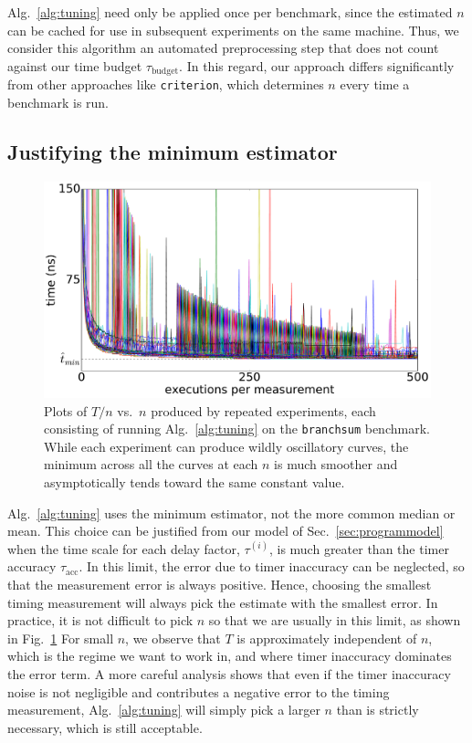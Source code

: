 \documentclass[conference]{IEEEtran}
\begin{document}
Alg.~\ref{alg:tuning} need only be applied once per benchmark, since the
estimated $n$ can be cached for use in subsequent experiments on the same
machine. Thus, we consider this algorithm an automated preprocessing step that
does not count against our time budget $\tau_{\textrm{budget}}$. In this
regard, our approach differs significantly from other approaches like
\lstinline|criterion|, which
determines $n$ every time a benchmark is run.



\subsection{Justifying the minimum estimator}
\label{sec:minimum}

\begin{figure}
\centering
\includegraphics[width=\columnwidth]{figures/fig2/linear_scan_branchsum}
\caption{Plots of $T/n$ vs.\ $n$ produced by repeated experiments, each
consisting of running Alg.~\ref{alg:tuning} on the \lstinline|branchsum|
benchmark. While each experiment can produce wildly oscillatory curves, the
minimum across all the curves at each $n$ is much smoother and asymptotically
tends toward the same constant value.}
\label{fig:scaling}
\end{figure}

Alg.~\ref{alg:tuning} uses the minimum estimator, not the more common median or
mean. This choice can be justified from our model of
Sec.~\ref{sec:programmodel} when the time scale for each delay factor,
$\tau^{(i)}$, is much greater than the timer accuracy $\tau_\textrm{acc}$. In
this limit, the error due to timer inaccuracy can be neglected, so that the
measurement error is always positive. Hence, choosing the smallest timing
measurement will always pick the estimate with the smallest error.
In practice, it is not difficult to pick $n$ so that  we are usually in this
limit, as shown in Fig.~\ref{fig:scaling} For small $n$, we observe that $T$ is
approximately independent of $n$, which is the regime we want to work in, and
where timer inaccuracy dominates the error term. A more careful analysis shows
that even if the timer inaccuracy noise is not negligible and contributes a
negative error to the timing measurement, Alg.~\ref{alg:tuning} will simply
pick a larger $n$ than is strictly necessary, which is still acceptable.
\end{document}
